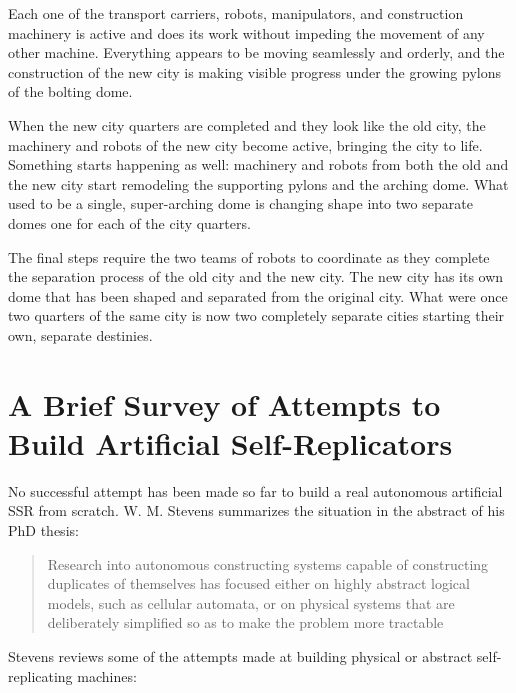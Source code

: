 Each one of the transport carriers, robots, manipulators, and
construction machinery is active and does its work without impeding the
movement of any other machine. Everything appears to be moving
seamlessly and orderly, and the construction of the new city is making
visible progress under the growing pylons of the bolting dome.

When the new city quarters are completed and they look
like the old city, the machinery and
robots of the new city become active, bringing the city to life. Something starts happening
as well: machinery and robots from both the old and the new city start
remodeling the supporting pylons and the arching dome.  
What used to be a single, super-arching dome is changing shape into two
separate domes one for each of the city quarters.

The final steps require the two teams of robots to coordinate as they complete the separation process of the old city and the new city. The new city has its own dome that has been shaped and separated from the original city. What were once two quarters of the same city is now two completely separate cities starting their own, separate destinies.

\section[Attempts to Build Artificial Self-Replicators]{A Brief Survey of Attempts to Build Artificial Self-Replicators}

No successful attempt has been made so far to build a real
autonomous artificial SSR from scratch. W. M. Stevens summarizes the
situation in the abstract of his PhD thesis:

\begin{quote}
Research into autonomous constructing systems capable of constructing
duplicates of themselves has focused either on highly abstract logical models, such as
cellular automata, or on physical systems that are deliberately simplified so as to make
the problem more tractable\citep{stevens2009}
\end{quote}

Stevens reviews some of the attempts made at building physical or
abstract self-replicating machines:

